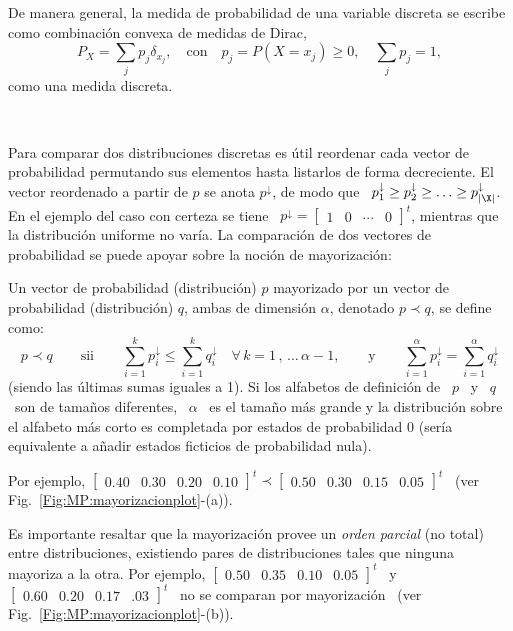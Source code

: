 De manera general, la medida de probabilidad de una variable discreta se escribe
como combinaci\'on convexa de medidas de Dirac,
%
\[
P_X =  \sum_j p_j  \delta_{x_j}, \quad  \mbox{con} \quad p_j =  P(X=x_j) \ge  0, \quad
\sum_j p_j = 1,
\]
%
\noindent \ie como una medida discreta.

\

Para comparar  dos distribuciones discretas  es \'util reordenar cada  vector de
probabilidad permutando  sus elementos hasta listarlos de  forma decreciente. El
vector  reordenado a  partir  de $p$  se  anota $p^\downarrow$,  de  modo que  \
$p^\downarrow_1 \ge  p^\downarrow_2 \ge \ldots \ge  p^\downarrow_{|\X|}$.  En el
ejemplo del caso con certeza se tiene  \ $p^\downarrow = \begin{bmatrix} 1 & 0 &
  \cdots  &  0 \end{bmatrix}^t$,  mientras  que  la  distribuci\'on uniforme  no
var\'ia.  La comparaci\'on de dos vectores de probabilidad se puede apoyar sobre
la noci\'on de mayorizaci\'on:
%
\begin{definicion}[Mayorizaci\'on]
\label{Def:MP:Mayorizacion}
%
  Un vector  de probabilidad  (distribuci\'on) $p$ mayorizado  por un  vector de
  probabilidad  (distribuci\'on) $q$,  ambas de  dimensi\'on $\alpha$,  denotado
  $p \prec q$, se define como:
  \[
  p   \prec  q   \qquad  \mbox{sii}   \qquad  \sum_{i=1}^k   p_i^\downarrow  \le
  \sum_{i=1}^k q_i^\downarrow \quad \forall \, k = 1 \, , \, \ldots \, \alpha-1,
  \qquad  \mbox{y} \qquad  \sum_{i=1}^\alpha p_i^\downarrow  = \sum_{i=1}^\alpha
  q_i^\downarrow
  \]
  (siendo las \'ultimas sumas iguales a 1).  Si los alfabetos de definici\'on de
  \ $p$  \ y \ $q$  \ son de tama\~nos  diferentes, \ $\alpha$ \  es el tama\~no
  m\'as grande y  la distribuci\'on sobre el alfabeto  m\'as corto es completada
  por  estados  de  probabilidad  0  (ser\'ia  equivalente  a  a\~nadir  estados
  ficticios de probabilidad nula).
\end{definicion}
%
\noindent   Por    ejemplo,   $\begin{bmatrix}   0.40   &   0.30    &   0.20   &
  0.10   \end{bmatrix}^t  \prec   \begin{bmatrix}   0.50  &   0.30   &  0.15   &
  0.05 \end{bmatrix}^t$ \ (ver Fig.~\ref{Fig:MP:mayorizacionplot}-(a)).

Es importante resaltar  que la mayorizaci\'on provee un  {\it orden parcial} (no
total)  entre  distribuciones,  existiendo  pares de  distribuciones  tales  que
ninguna mayoriza a la otra.  Por  ejemplo, $\begin{bmatrix} 0.50 & 0.35 & 0.10 &
  0.05  \end{bmatrix}^t$  \   y  \  $\begin{bmatrix}  0.60  &   0.20  &  0.17  &
  .03   \end{bmatrix}^t$  \   no   se  comparan   por   mayorizaci\'on  \   (ver
Fig.~\ref{Fig:MP:mayorizacionplot}-(b)).

